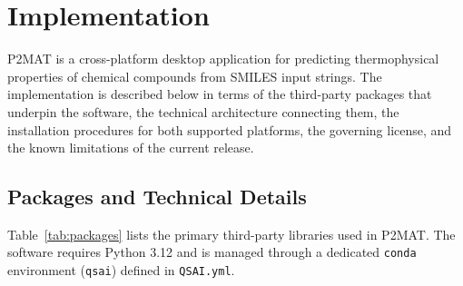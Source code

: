 
\section{Implementation}
\label{sec:implementation}

P2MAT is a cross-platform desktop application for predicting thermophysical
properties of chemical compounds from SMILES input strings.
The implementation is described below in terms of the third-party packages that
underpin the software, the technical architecture connecting them, the
installation procedures for both supported platforms, the governing license, and
the known limitations of the current release.

\subsection{Packages and Technical Details}
\label{subsec:packages}

Table~\ref{tab:packages} lists the primary third-party libraries used in P2MAT.
The software requires Python 3.12 and is managed through a dedicated
\texttt{conda} environment (\texttt{qsai}) defined in \texttt{QSAI.yml}.

